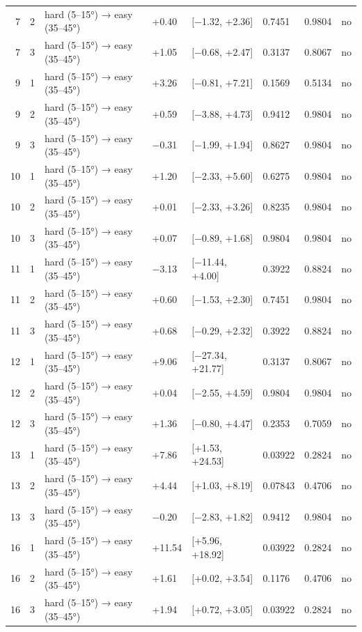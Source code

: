 \begin{table}[htbp]
\begin{tabular}{rlllllll}
    7 & 2 & hard (5–15°) → easy (35–45°) & +0.40 & [−1.32, +2.36] & 0.7451 & 0.9804 & no \\
    7 & 3 & hard (5–15°) → easy (35–45°) & +1.05 & [−0.68, +2.47] & 0.3137 & 0.8067 & no \\
    9 & 1 & hard (5–15°) → easy (35–45°) & +3.26 & [−0.81, +7.21] & 0.1569 & 0.5134 & no \\
    9 & 2 & hard (5–15°) → easy (35–45°) & +0.59 & [−3.88, +4.73] & 0.9412 & 0.9804 & no \\
    9 & 3 & hard (5–15°) → easy (35–45°) & −0.31 & [−1.99, +1.94] & 0.8627 & 0.9804 & no \\
    10 & 1 & hard (5–15°) → easy (35–45°) & +1.20 & [−2.33, +5.60] & 0.6275 & 0.9804 & no \\
    10 & 2 & hard (5–15°) → easy (35–45°) & +0.01 & [−2.33, +3.26] & 0.8235 & 0.9804 & no \\
    10 & 3 & hard (5–15°) → easy (35–45°) & +0.07 & [−0.89, +1.68] & 0.9804 & 0.9804 & no \\
    11 & 1 & hard (5–15°) → easy (35–45°) & −3.13 & [−11.44, +4.00] & 0.3922 & 0.8824 & no \\
    11 & 2 & hard (5–15°) → easy (35–45°) & +0.60 & [−1.53, +2.30] & 0.7451 & 0.9804 & no \\
    11 & 3 & hard (5–15°) → easy (35–45°) & +0.68 & [−0.29, +2.32] & 0.3922 & 0.8824 & no \\
    12 & 1 & hard (5–15°) → easy (35–45°) & +9.06 & [−27.34, +21.77] & 0.3137 & 0.8067 & no \\
    12 & 2 & hard (5–15°) → easy (35–45°) & +0.04 & [−2.55, +4.59] & 0.9804 & 0.9804 & no \\
    12 & 3 & hard (5–15°) → easy (35–45°) & +1.36 & [−0.80, +4.47] & 0.2353 & 0.7059 & no \\
    13 & 1 & hard (5–15°) → easy (35–45°) & +7.86 & [+1.53, +24.53] & 0.03922 & 0.2824 & no \\
    13 & 2 & hard (5–15°) → easy (35–45°) & +4.44 & [+1.03, +8.19] & 0.07843 & 0.4706 & no \\
    13 & 3 & hard (5–15°) → easy (35–45°) & −0.20 & [−2.83, +1.82] & 0.9412 & 0.9804 & no \\
    16 & 1 & hard (5–15°) → easy (35–45°) & +11.54 & [+5.96, +18.92] & 0.03922 & 0.2824 & no \\
    16 & 2 & hard (5–15°) → easy (35–45°) & +1.61 & [+0.02, +3.54] & 0.1176 & 0.4706 & no \\
    16 & 3 & hard (5–15°) → easy (35–45°) & +1.94 & [+0.72, +3.05] & 0.03922 & 0.2824 & no \\
    \bottomrule
  \end{tabular}
\end{table}
